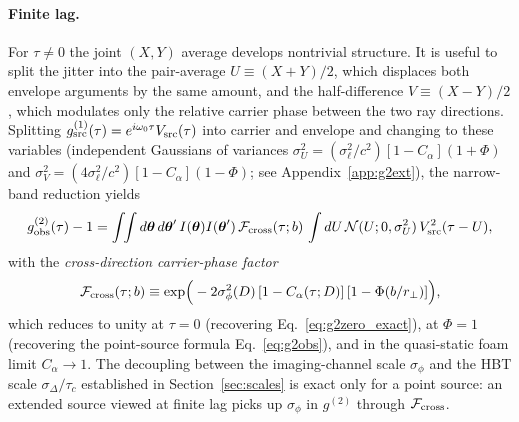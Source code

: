 \documentclass[aps,prd,onecolumn,amsmath,amssymb]{revtex4-2}
\begin{document}
\paragraph{Finite lag.}
For $\tau \neq 0$ the joint $(X,Y)$ average develops nontrivial structure.
It is useful to split the jitter into the pair-average $U \equiv (X+Y)/2$,
which displaces both envelope arguments by the same amount, and the
half-difference $V \equiv (X-Y)/2$, which modulates only the relative
carrier phase between the two ray directions.
Splitting $g^{(1)}_{\rm src}(\tau)=e^{i\omega_0\tau}V_{\rm src}(\tau)$ into
carrier and envelope and changing to these variables (independent Gaussians of variances
$\sigma_U^2 = (\sigma_\ell^2/c^2)[1-C_\alpha](1+\Phi)$ and
$\sigma_V^2 = (4\sigma_\ell^2/c^2)[1-C_\alpha](1-\Phi)$; see
Appendix~\ref{app:g2ext}), the narrow-band reduction yields
\begin{equation}
  g^{(2)}_{\rm obs}(\tau) - 1
  = \int\!\!\int d\boldsymbol{\theta}\,d\boldsymbol{\theta}'\,
    I(\boldsymbol{\theta})I(\boldsymbol{\theta}')\,
    \mathcal{F}_{\rm cross}(\tau;b)\,
    \int dU\,\mathcal{N}(U;0,\sigma_U^2)\,V_{\rm src}^2(\tau-U),
  \label{eq:g2ext_corrected}
\end{equation}
with the \emph{cross-direction carrier-phase factor}
\begin{equation}
  \mathcal{F}_{\rm cross}(\tau;b)
  \equiv \exp\!\Big(-2\sigma_\phi^2(D)\,[1-C_\alpha(\tau;D)]\,
                    [1-\Phi(b/r_\perp)]\Big),
  \label{eq:Fcross}
\end{equation}
which reduces to unity at $\tau=0$ (recovering Eq.~\eqref{eq:g2zero_exact}),
at $\Phi=1$ (recovering the point-source formula
Eq.~\eqref{eq:g2obs}), and in the quasi-static foam limit $C_\alpha\to 1$.
The decoupling between the imaging-channel scale $\sigma_\phi$ and the
HBT scale $\sigma_\Delta/\tau_c$ established in
Section~\ref{sec:scales} is exact only for a point source: an extended
source viewed at finite lag picks up $\sigma_\phi$ in $g^{(2)}$ through
$\mathcal{F}_{\rm cross}$.
\end{document}
